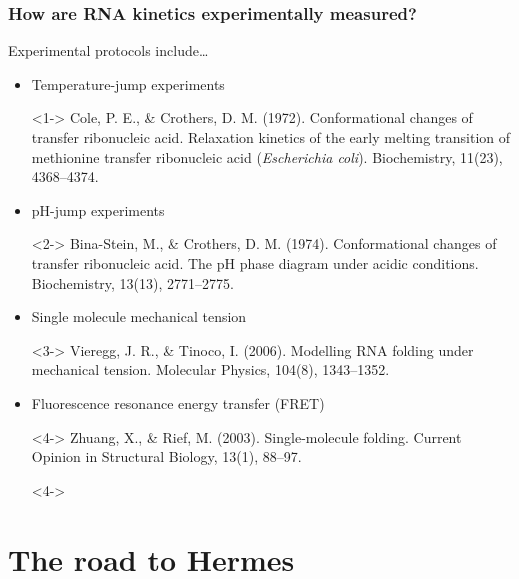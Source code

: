 \documentclass{beamer}
\begin{document}
\begin{frame}
  \frametitle{How are RNA kinetics experimentally measured?}

  \begin{block}
    {Experimental protocols include\dots}
    \begin{itemize}
      \item<1-> Temperature-jump experiments
      \item[]<1-> \scriptsize Cole, P. E., \& Crothers, D. M. (1972). Conformational changes of transfer ribonucleic acid. Relaxation kinetics of the early melting transition of methionine transfer ribonucleic acid ({\em Escherichia coli}). Biochemistry, 11(23), 4368--4374.
      \item<2-> pH-jump experiments
      \item[]<2-> \scriptsize Bina-Stein, M., \& Crothers, D. M. (1974). Conformational changes of transfer ribonucleic acid. The pH phase diagram under acidic conditions. Biochemistry, 13(13), 2771--2775.
      \item<3-> Single molecule mechanical tension
      \item[]<3-> \scriptsize Vieregg, J. R., \& Tinoco, I. (2006). Modelling RNA folding under mechanical tension. Molecular Physics, 104(8), 1343--1352.
      \item<4-> Fluorescence resonance energy transfer (FRET)
      \item[]<4-> \scriptsize Zhuang, X., \& Rief, M. (2003). Single-molecule folding. Current Opinion in Structural Biology, 13(1), 88--97.
      \item[]<4->
    \end{itemize}
  \end{block}
\end{frame}

\section{The road to Hermes}
\end{document}
